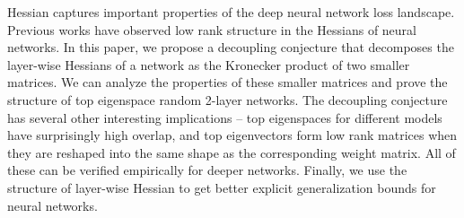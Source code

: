 Hessian captures important properties of the deep neural network loss landscape. Previous works have observed low rank structure in the Hessians of neural networks. In this paper, we propose a decoupling conjecture that decomposes the layer-wise Hessians of a network as the Kronecker product of two smaller matrices. We can analyze the properties of these smaller matrices and prove the structure of top eigenspace random 2-layer networks. %
The decoupling conjecture has several other interesting implications \--- top eigenspaces for different models have surprisingly high overlap, and top eigenvectors form low rank matrices when they are reshaped into the same shape as the corresponding weight matrix. All of these can be verified empirically for deeper networks. Finally, we use the structure of layer-wise Hessian to get better explicit generalization bounds for neural networks.